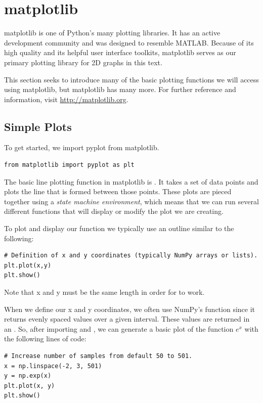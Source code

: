 \label{lab:Matplotlib_and_Mayavi}

\section*{matplotlib}
matplotlib is one of Python's many plotting libraries.
It has an active development community and was designed to resemble MATLAB.
Because of its high quality and its helpful user interface toolkits, matplotlib serves as our primary plotting library for 2D graphs in this text.

This section seeks to introduce many of the basic plotting functions we will access using matplotlib, but matplotlib has many more.
For further reference and information, visit \url{http://matplotlib.org}.


\subsection*{Simple Plots}
To get started, we import pyplot from matplotlib.
\begin{lstlisting}
from matplotlib import pyplot as plt
\end{lstlisting}

The basic line plotting function in matplotlib is .
It takes a set of data points and plots the line that is formed between those points.
These plots are pieced together using a \emph{state machine environment}, which means that we can run several different functions that will display or modify the plot we are creating.

To plot and display our function we typically use an outline similar to the following:
\begin{lstlisting}
# Definition of x and y coordinates (typically NumPy arrays or lists).
plt.plot(x,y)
plt.show()
\end{lstlisting}
Note that x and y must be the same length in order for  to work.

When we define our x and y coordinates, we often use NumPy's  function since it returns evenly spaced values over a given interval.
These values are returned in an .
So, after importing  and , we can generate a basic plot of the function $e^x$ with the following lines of code:
\begin{lstlisting}
# Increase number of samples from default 50 to 501.
x = np.linspace(-2, 3, 501)
y = np.exp(x)
plt.plot(x, y)
plt.show()
\end{lstlisting}

